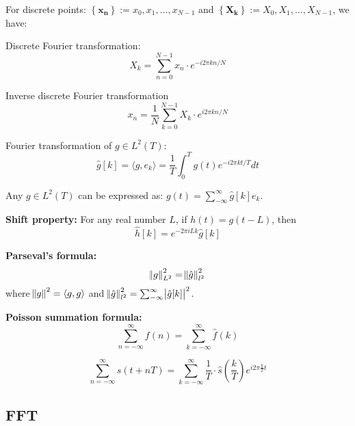 \documentclass[12pt]{article}
\numberwithin{equation}{section}
\begin{document}
For discrete points: $\left \{ \mathbf{ x_n } \right \} := x_0, x_1, \ldots, x_{N-1}$ and 
$\left \{ \mathbf{X_k} \right \} := X_0, X_1, \ldots, X_{N-1}$, we have: \par
Discrete Fourier transformation: 
\begin{equation}\label{eq:fourierdisc}
	X_k = \sum_{n=0}^{N-1} x_n \cdot e^{-i2\pi kn/N}
\end{equation} \par
Inverse discrete Fourier transformation
\begin{equation}
x_n = \frac{1}{N}\sum_{k=0}^{N-1}X_k \cdot e^{i 2 \pi kn/N} 
\end{equation} \par 

Fourier transformation of $g \in L^2(T)$: 
\begin{equation}\label{eq:fourierL2T}
	\hat{g}[k] = \langle g , e_k \rangle = \frac{1}{T} \int^{T}_{0} g(t)e^{-i 2\pi kt/T} dt
\end{equation} \par

Any $g \in L^2(T)$ can be expressed as: $g(t)=\sum^{\infty}_{-\infty}\hat{g}[k] e_k$. \par
\textbf{Shift property:} For any real number $L$, if $h(t)=g(t-L)$, then
\begin{equation} \label{eq:fouriershift}
	\hat{h}[k]=e^{-2\pi i L k} \hat{g}[k]
\end{equation}

\textbf{Parseval's formula:}
\begin{equation} \label{eq:parseval}
	\norm{g}^2_{L^2}=\norm{\hat{g}}^2_{l^2}
\end{equation}
where $\norm{g}^2= \langle g , g \rangle$ and $\norm{\hat{g}}^2_{l^2}=\sum^{\infty}_{-\infty}\abs{\hat{g}[k]}^2$. \par

\textbf{Poisson summation formula:}
\begin{equation}
	\sum_{n=-\infty}^\infty f(n)=\sum_{k=-\infty}^\infty \hat f\left(k\right)
\end{equation} \par
\begin{equation} \label{eq:poisson}
	\sum_{n=-\infty}^{\infty} s(t + nT)=\sum_{k=-\infty}^{\infty} \frac{1}{T}\cdot \hat s\left(\frac{k}{T}\right)e^{i 2\pi \frac{k}{T} t }
\end{equation} \par
\subsection{FFT}
\end{document}
